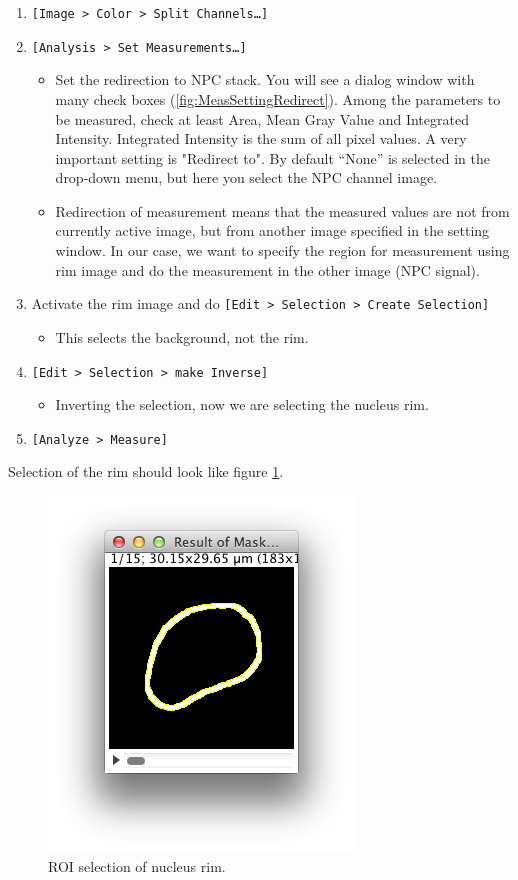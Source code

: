 \documentclass[11pt,a4paper,oneside]{report}
\newcommand{\ijmenu}[1]{\texttt{\small#1}}
\begin{document}
\begin{enumerate}
  \item \ijmenu{[Image > Color > Split Channels\ldots]}
  \item \ijmenu{[Analysis > Set Measurements\ldots]}
  \begin{itemize}
    \item Set the redirection to NPC stack. You will see a dialog window with many check boxes (\ref{fig:MeasSettingRedirect}). Among the parameters to be measured, check at least Area, Mean Gray Value and Integrated Intensity. Integrated Intensity is the sum of all pixel values. A very important setting is "Redirect to". By default ``None'' is selected in the drop-down menu, but here you select the NPC channel image.
    \item Redirection of measurement means that the measured values are not from currently active image, but from another image specified in the setting window. In our case, we want to specify the region for measurement using rim image and do the measurement in the other image (NPC signal). 
  \end{itemize}
  \item Activate the rim image and do \ijmenu{[Edit > Selection > Create Selection]}
  \begin{itemize}
    \item This selects the background, not the rim. 
  \end{itemize}
  \item \ijmenu{[Edit > Selection > make Inverse]}
  \begin{itemize}
    \item Inverting the selection, now we are selecting the nucleus rim. 
  \end{itemize}
  \item \ijmenu{[Analyze > Measure]}
\end{enumerate}

Selection of the rim should look like figure \ref{fig_RoiNucRim}.

\begin{figure}[h!]
\begin{center}
\includegraphics[scale=0.8]{fig/ROIselectionNucRim.png}
\caption{ROI selection of nucleus rim. }
\label{fig_RoiNucRim}
\end{center}
\end{figure}
\end{document}
